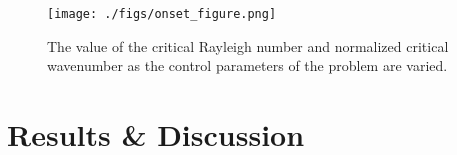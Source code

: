 \documentclass[titlepage, twocolumn, fontsize=10]{aastex6}
\begin{document}
\begin{figure}
\centering
\texttt{[image: ./figs/onset\_figure.png]}
\caption{The value of the critical Rayleigh number and normalized critical wavenumber
as the control parameters of the problem are varied. \label{fig:onset_curves}}
\end{figure}


\section{Results \& Discussion}
\label{sec:results}


\end{document}
